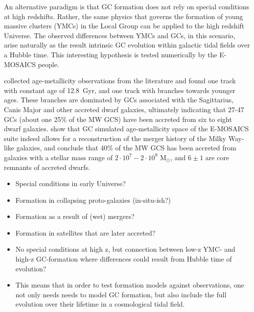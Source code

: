 \documentclass[a4paper,fleqn,usenatbib]{mnras}
\newcommand{\Sun}[0]{\ensuremath{_{\odot}}}
\begin{document}
An alternative paradigm is that GC formation does not rely on special conditions
at high redshifts. Rather, the same physics that governs the formation of young
massive clusters (YMCs) in the Local Group can be applied to the high redshift
Universe. The observed differences between YMCs and GCs, in this scenario, arise
naturally as the result intrinsic GC evolution within galactic tidal fields over
a Hubble time. This interesting hypothesis is tested numerically by the E-MOSAICS
people.


\citet{2010MNRAS.404.1203F} collected age-metallicity observations from the
literature and found one track with constant age of 12.8~Gyr, and one track
with branches towards younger ages. These branches are dominated by GCs associated
with the Sagittarius, Canis Major and other accreted dwarf galaxies, ultimately
indicating that 27-47 GCs (about one 25\% of the MW GCS) have been accreted
from six to eight dwarf galaxies. \citet{2019MNRAS.486.3134K, 2019MNRAS.486.3180K}
show that GC simulated age-metallicity space of the E-MOSAICS suite indeed allows
for a reconstruction of the merger history of the Milky Way-like galaxies, and
conclude that 40\% of the MW GCS has been accreted from galaxies with a stellar
mass range of $2 \cdot 10^{7} - 2 \cdot 10^{9}$ M\Sun, and $6\pm1$ are core remnants
of accreted dwarfs.



%
%


\begin{itemize}
    \item Special conditions in early Universe?
    \item Formation in collapsing proto-galaxies (in-situ-ish?)
    \item Formation as a result of (wet) mergers?
    \item Formation in satellites that are later accreted?
    \item No special conditions at high z, but connection between low-z YMC-
        and high-z GC-formation where differences could result from Hubble time
        of evolution?
    \item This means that in order to test formation models against observations,
        one not only needs needs to model GC formation, but also include the full
        evolution over their lifetime in a cosmological tidal field.
\end{itemize}
\end{document}
